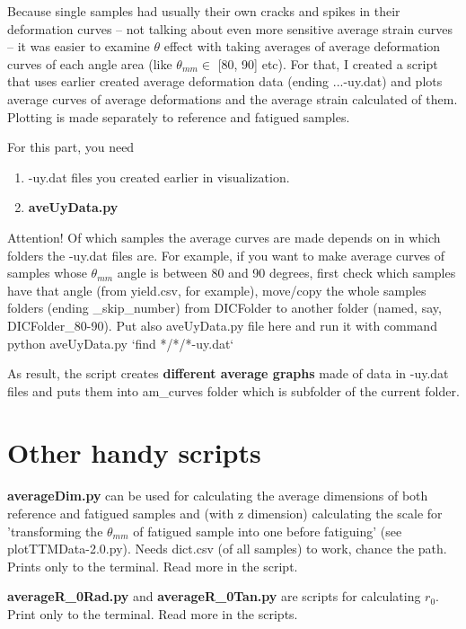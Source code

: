 \documentclass[a4paper]{article}
\begin{document}
Because single samples had usually their own cracks and spikes in their 
deformation curves -- not talking about even more sensitive average strain 
curves -- it was easier to examine $\theta$ effect with taking averages of 
average deformation curves of each angle area (like $\theta_{mm} \in$ 
[80\textdegree, 90\textdegree] etc). For that, I created a script that uses 
earlier created average deformation data (ending ...-uy.dat) and plots average 
curves of average deformations and the average strain calculated of them. 
Plotting is made separately to reference and fatigued samples.

For this part, you need

\begin{enumerate}
\item -uy.dat files you created earlier in visualization.
\item \textbf{aveUyData.py}
\end{enumerate}

Attention! Of which samples the average curves are made depends on in which 
folders the -uy.dat files are. For example, if you want to make average curves 
of samples whose $\theta_{mm}$ angle is between 80 and 90 degrees, first check 
which samples have that angle (from yield.csv, for example), move/copy the 
whole samples folders (ending \_skip\_number) from DICFolder to another folder 
(named, say, DICFolder\_80-90). Put also aveUyData.py file here and run it with 
command \textsf{python aveUyData.py `find */*/*-uy.dat`}

As result, the script creates \textbf{different average graphs} made of data 
in -uy.dat files and puts them into am\_curves folder which is subfolder of 
the current folder.

\section{Other handy scripts}

\textbf{averageDim.py} can be used for calculating the average dimensions of both 
reference and fatigued samples and (with z dimension) calculating the scale for
'transforming the $\theta_{mm}$ of fatigued sample into one before fatiguing' 
(see plotTTMData-2.0.py). Needs dict.csv (of all samples) to work, chance the path. 
Prints only to the terminal. Read more in the script.

\textbf{averageR\_0Rad.py} and \textbf{averageR\_0Tan.py} are scripts for calculating
$r_0$. Print only to the terminal. Read more in the scripts.
\end{document}
